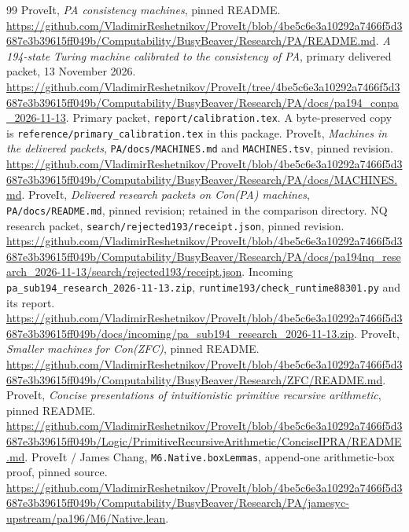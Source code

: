 \documentclass[11pt,letterpaper]{article}
\newcommand{\file}[1]{\texttt{\nolinkurl{#1}}}
\begin{document}
\clearpage
\begin{thebibliography}{99}
 ProveIt, \emph{PA consistency machines}, pinned README.
\url{https://github.com/VladimirReshetnikov/ProveIt/blob/4be5c6e3a10292a7466f5d3687e3b39615ff049b/Computability/BusyBeaver/Research/PA/README.md}.
 \emph{A 194-state Turing machine calibrated to the consistency of PA},
primary delivered packet, 13 November 2026.
\url{https://github.com/VladimirReshetnikov/ProveIt/tree/4be5c6e3a10292a7466f5d3687e3b39615ff049b/Computability/BusyBeaver/Research/PA/docs/pa194_conpa_2026-11-13}.
 Primary packet, \file{report/calibration.tex}.
A byte-preserved copy is \file{reference/primary_calibration.tex} in this package.
 ProveIt, \emph{Machines in the delivered packets},
\file{PA/docs/MACHINES.md} and \file{MACHINES.tsv}, pinned revision.
\url{https://github.com/VladimirReshetnikov/ProveIt/blob/4be5c6e3a10292a7466f5d3687e3b39615ff049b/Computability/BusyBeaver/Research/PA/docs/MACHINES.md}.
 ProveIt, \emph{Delivered research packets on Con(PA) machines},
\file{PA/docs/README.md}, pinned revision; retained in the comparison directory.
 NQ research packet,
\file{search/rejected193/receipt.json}, pinned revision.
\url{https://github.com/VladimirReshetnikov/ProveIt/blob/4be5c6e3a10292a7466f5d3687e3b39615ff049b/Computability/BusyBeaver/Research/PA/docs/pa194nq_research_2026-11-13/search/rejected193/receipt.json}.
 Incoming \file{pa_sub194_research_2026-11-13.zip},
\file{runtime193/check_runtime88301.py} and its report.
\url{https://github.com/VladimirReshetnikov/ProveIt/blob/4be5c6e3a10292a7466f5d3687e3b39615ff049b/docs/incoming/pa_sub194_research_2026-11-13.zip}.
 ProveIt, \emph{Smaller machines for Con(ZFC)}, pinned README.
\url{https://github.com/VladimirReshetnikov/ProveIt/blob/4be5c6e3a10292a7466f5d3687e3b39615ff049b/Computability/BusyBeaver/Research/ZFC/README.md}.
 ProveIt, \emph{Concise presentations of intuitionistic primitive recursive arithmetic}, pinned README.
\url{https://github.com/VladimirReshetnikov/ProveIt/blob/4be5c6e3a10292a7466f5d3687e3b39615ff049b/Logic/PrimitiveRecursiveArithmetic/ConciseIPRA/README.md}.
 ProveIt / James Chang, \file{M6.Native.boxLemmas},
append-one arithmetic-box proof, pinned source.
\url{https://github.com/VladimirReshetnikov/ProveIt/blob/4be5c6e3a10292a7466f5d3687e3b39615ff049b/Computability/BusyBeaver/Research/PA/jamesyc-upstream/pa196/M6/Native.lean}.
\end{thebibliography}
\end{document}
